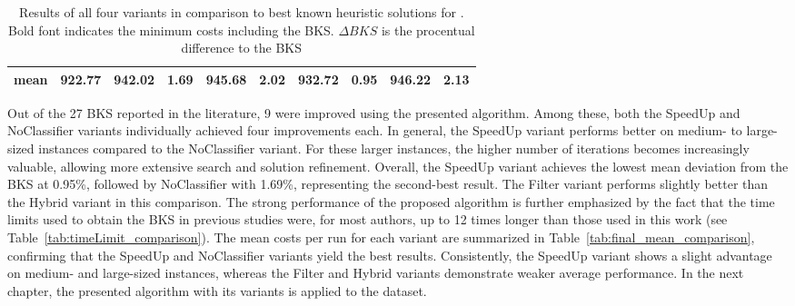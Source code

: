 \begin{table}[ht]
\begin{tabular}{@{}llcccccccc@{}}
		mean                & 922.77                      & 942.02                           & 1.69                       & 945.68                      & 2.02                       & 932.72           & 0.95         & 946.22          & 2.13         \\
		\bottomrule
	\end{tabular}
	\caption[Results of all four variants in comparison to best known heuristic solutions for \gendreauDataSet.]
	{Results of all four variants in comparison to best known heuristic solutions for \gendreauDataSet. Bold font indicates the
		minimum costs including the BKS. $\Delta BKS$ is the procentual difference to the BKS}
	\label{tab:final_best_results_gendreau}
\end{table}

Out of the 27 \gls{BKS} reported in the literature, 9 were improved using the presented algorithm. Among these,
both the SpeedUp and NoClassifier variants individually achieved four improvements each. In general, the SpeedUp variant performs
better on medium- to large-sized instances compared to the NoClassifier variant. For these larger instances, the higher number of
iterations becomes increasingly valuable, allowing more extensive search and solution refinement.
Overall, the SpeedUp variant achieves the lowest mean deviation from the \gls{BKS} at 0.95\%, followed by NoClassifier with 1.69\%,
representing the second-best result. The Filter variant performs slightly better than the Hybrid variant in this comparison. The
strong performance of the proposed algorithm is further emphasized by the fact that the time limits used to obtain the \gls{BKS}
in previous studies were, for most authors, up to 12 times longer than those used in this work (see Table~\ref{tab:timeLimit_comparison}).
The mean costs per run for each variant are summarized in Table~\ref{tab:final_mean_comparison}, confirming that the SpeedUp
and NoClassifier variants yield the best results. Consistently, the SpeedUp variant shows a slight advantage on medium- and large-sized
instances, whereas the Filter and Hybrid variants demonstrate weaker average performance. In the next chapter, the presented
algorithm with its variants is applied to the \krebsADataSetText dataset.